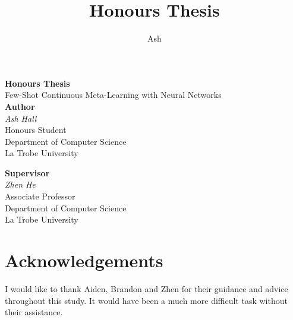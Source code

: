 \documentclass{report}
\title{Honours Thesis}
\author{Ash}
\begin{document}
\begin{titlepage}
 \begin{center}
  \vspace*{5cm}
  {\huge \textbf{Honours Thesis}} \\
  \vspace{0.3cm}
  {\large Few-Shot Continuous Meta-Learning with Neural Networks} \\
  \vspace*{2cm}
  \textbf{Author} \\
  \textit{Ash Hall} \\
  Honours Student \\
  Department of Computer Science \\
  La Trobe University \\
  \vspace{0.75cm}

  \textbf{Supervisor} \\
  \textit{Zhen He} \\
  Associate Professor \\
  Department of Computer Science \\
  La Trobe University \\


  \vfill
 \end{center}
\end{titlepage}

\chapter*{Acknowledgements}
\thispagestyle{empty}
I would like to thank Aiden, Brandon and Zhen for their guidance and advice throughout this study. It would have been a much more difficult task without their assistance.

\clearpage


\thispagestyle{empty}
\newpage
\thispagestyle{empty}
\tableofcontents
\newpage
\thispagestyle{empty}
\listoffigures
\newpage
\end{document}
